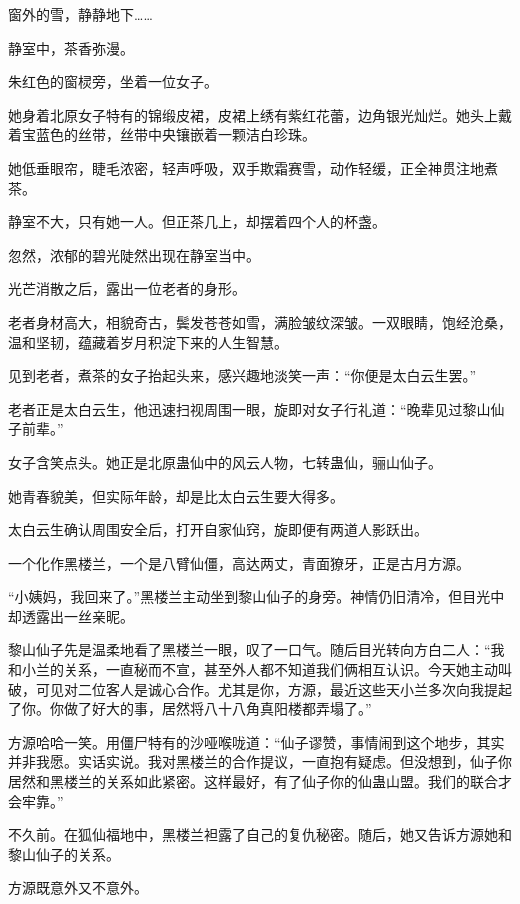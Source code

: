 
\begin{this_body}

窗外的雪，静静地下……

静室中，茶香弥漫。

朱红色的窗棂旁，坐着一位女子。

她身着北原女子特有的锦缎皮裙，皮裙上绣有紫红花蕾，边角银光灿烂。她头上戴着宝蓝色的丝带，丝带中央镶嵌着一颗洁白珍珠。

她低垂眼帘，睫毛浓密，轻声呼吸，双手欺霜赛雪，动作轻缓，正全神贯注地煮茶。

静室不大，只有她一人。但正茶几上，却摆着四个人的杯盏。

忽然，浓郁的碧光陡然出现在静室当中。

光芒消散之后，露出一位老者的身形。

老者身材高大，相貌奇古，鬓发苍苍如雪，满脸皱纹深皱。一双眼睛，饱经沧桑，温和坚韧，蕴藏着岁月积淀下来的人生智慧。

见到老者，煮茶的女子抬起头来，感兴趣地淡笑一声：“你便是太白云生罢。”

老者正是太白云生，他迅速扫视周围一眼，旋即对女子行礼道：“晚辈见过黎山仙子前辈。”

女子含笑点头。她正是北原蛊仙中的风云人物，七转蛊仙，骊山仙子。

她青春貌美，但实际年龄，却是比太白云生要大得多。

太白云生确认周围安全后，打开自家仙窍，旋即便有两道人影跃出。

一个化作黑楼兰，一个是八臂仙僵，高达两丈，青面獠牙，正是古月方源。

“小姨妈，我回来了。”黑楼兰主动坐到黎山仙子的身旁。神情仍旧清冷，但目光中却透露出一丝亲昵。

黎山仙子先是温柔地看了黑楼兰一眼，叹了一口气。随后目光转向方白二人：“我和小兰的关系，一直秘而不宣，甚至外人都不知道我们俩相互认识。今天她主动叫破，可见对二位客人是诚心合作。尤其是你，方源，最近这些天小兰多次向我提起了你。你做了好大的事，居然将八十八角真阳楼都弄塌了。”

方源哈哈一笑。用僵尸特有的沙哑喉咙道：“仙子谬赞，事情闹到这个地步，其实并非我愿。实话实说。我对黑楼兰的合作提议，一直抱有疑虑。但没想到，仙子你居然和黑楼兰的关系如此紧密。这样最好，有了仙子你的仙蛊山盟。我们的联合才会牢靠。”

不久前。在狐仙福地中，黑楼兰袒露了自己的复仇秘密。随后，她又告诉方源她和黎山仙子的关系。

方源既意外又不意外。


\end{this_body}
